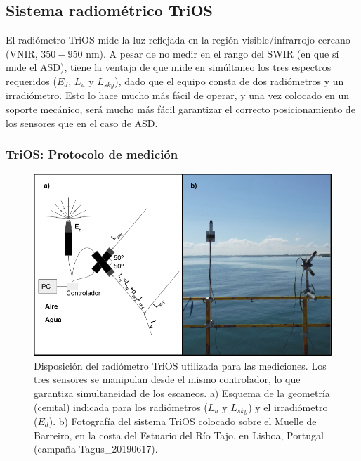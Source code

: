     \subsection{Sistema radiométrico TriOS}
    \label{dat:s:trios}
        
        El radiómetro TriOS mide la luz reflejada en la región visible/infrarrojo cercano (VNIR, $350-950$ nm). A pesar de no medir en el rango del SWIR (en que sí mide el ASD), tiene la ventaja de que mide en simúltaneo los tres espectros requeridos ($E_{d}$, $L_{u}$ y $L_{sky}$), dado que el equipo consta de dos radiómetros y un irradiómetro. Esto lo hace mucho más fácil de operar, y una vez colocado en un soporte mecánico, será mucho más fácil garantizar el correcto posicionamiento de los sensores que en el caso de ASD.

        \subsubsection{TriOS: Protocolo de medición}
        \label{dat:s:triosMed}

            \begin{figure}
            \centering
            \includegraphics[width=\textwidth]{dat/figures/TriOS.png}
            \caption[Disposición del radiómetro TriOS utilizada para las mediciones.]{Disposición del radiómetro TriOS utilizada para las mediciones. Los tres sensores se manipulan desde el mismo controlador, lo que garantiza simultaneidad de los escaneos. a) Esquema de la geometría (cenital) indicada para los radiómetros ($L_{u}$ y $L_{sky}$) y el irradiómetro ($E_{d}$). b) Fotografía del sistema TriOS colocado sobre el Muelle de Barreiro, en la costa del Estuario del Río Tajo, en Lisboa, Portugal (campaña Tagus\_20190617).}
            \label{dat:TriOS}
            \end{figure}


